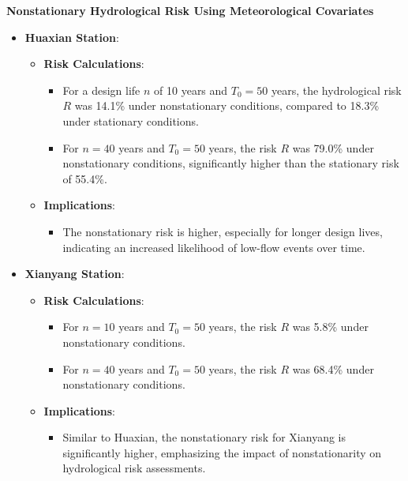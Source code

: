 \documentclass[
]{krantz}
\providecommand{\tightlist}{%
  \setlength{\itemsep}{0pt}\setlength{\parskip}{0pt}}
\begin{document}
\textbf{Nonstationary Hydrological Risk Using Meteorological Covariates}

\begin{itemize}
\tightlist
\item
  \textbf{Huaxian Station}:

  \begin{itemize}
  \tightlist
  \item
    \textbf{Risk Calculations}:

    \begin{itemize}
    \tightlist
    \item
      For a design life \(n\) of 10 years and \(T_0 = 50\) years, the hydrological risk \(R\) was 14.1\% under nonstationary conditions, compared to 18.3\% under stationary conditions.
    \item
      For \(n = 40\) years and \(T_0 = 50\) years, the risk \(R\) was 79.0\% under nonstationary conditions, significantly higher than the stationary risk of 55.4\%.
    \end{itemize}
  \item
    \textbf{Implications}:

    \begin{itemize}
    \tightlist
    \item
      The nonstationary risk is higher, especially for longer design lives, indicating an increased likelihood of low-flow events over time.
    \end{itemize}
  \end{itemize}
\item
  \textbf{Xianyang Station}:

  \begin{itemize}
  \tightlist
  \item
    \textbf{Risk Calculations}:

    \begin{itemize}
    \tightlist
    \item
      For \(n = 10\) years and \(T_0 = 50\) years, the risk \(R\) was 5.8\% under nonstationary conditions.
    \item
      For \(n = 40\) years and \(T_0 = 50\) years, the risk \(R\) was 68.4\% under nonstationary conditions.
    \end{itemize}
  \item
    \textbf{Implications}:

    \begin{itemize}
    \tightlist
    \item
      Similar to Huaxian, the nonstationary risk for Xianyang is significantly higher, emphasizing the impact of nonstationarity on hydrological risk assessments.
    \end{itemize}
  \end{itemize}
\end{itemize}
\end{document}
